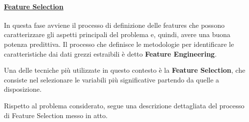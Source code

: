 \paragraph{\textcolor[HTML]{000099}{\underline{Feature Selection}}}
In questa fase avviene il processo di definizione delle features che possono caratterizzare gli aspetti principali del problema e, quindi, avere una buona potenza predittiva.
Il processo che definisce le metodologie per identificare le caratteristiche dai dati grezzi estraibili è detto \textbf{Feature Engineering}.

Una delle tecniche più utilizzate in questo contesto è la \textbf{Feature Selection}, che consiste nel selezionare le variabili più significative partendo da quelle a disposizione.

Rispetto al problema considerato, segue una descrizione dettagliata del processo di Feature Selection messo in atto.

